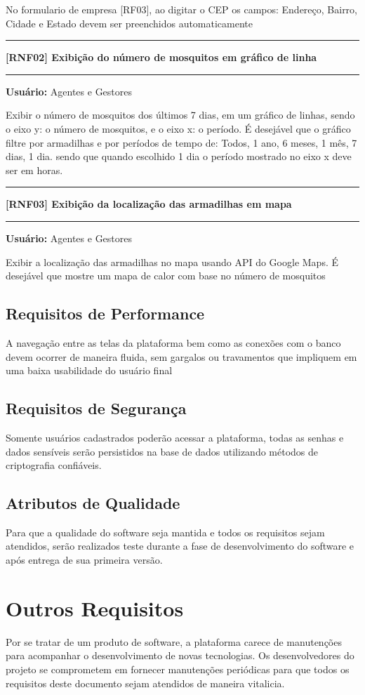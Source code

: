 \documentclass{scrreprt}
\begin{document}
	No formulario de empresa [RF03], ao digitar o CEP os campos: Endereço, Bairro, Cidade e Estado devem ser preenchidos automaticamente
	\begin{center}
		\noindent\rule{16cm}{0.4pt}
		\textbf{[RNF02] Exibição do número de mosquitos em gráfico de linha}
		\noindent\rule{16cm}{0.4pt}
	\end{center}
	\textbf{Usuário:} Agentes e Gestores
	
	Exibir o número de mosquitos dos últimos 7 dias, em um gráfico de linhas, sendo o eixo y: o número de mosquitos, e o eixo x: o período. É desejável que o gráfico filtre por armadilhas e por períodos de tempo de: Todos, 1 ano, 6 meses, 1 mês, 7 dias, 1 dia. sendo que quando escolhido 1 dia o período mostrado no eixo x deve ser em horas.
	\begin{center}
		\noindent\rule{16cm}{0.4pt}
		\textbf{[RNF03] Exibição da localização das armadilhas em mapa}
		\noindent\rule{16cm}{0.4pt}
	\end{center}
	\textbf{Usuário:} Agentes e Gestores
	
	Exibir a localização das armadilhas no mapa usando API do Google Maps. É desejável que mostre um mapa de calor com base no número de mosquitos 
	
	\section{Requisitos de Performance}
	A navegação entre as telas da plataforma bem como as conexões com o banco devem ocorrer de maneira fluida, sem gargalos ou travamentos que impliquem em uma baixa usabilidade do usuário final
	
	\section{Requisitos de Segurança}
	Somente usuários cadastrados poderão acessar a plataforma, todas as senhas e dados sensíveis serão persistidos na base de dados utilizando métodos de criptografia confiáveis.
	
	\section{Atributos de Qualidade}
	Para que a qualidade do software seja mantida e todos os requisitos sejam atendidos, serão realizados teste durante a fase de desenvolvimento do software e após entrega de sua primeira versão.
	
	\chapter{Outros Requisitos}
	Por se tratar de um produto de software, a plataforma carece de manutenções para acompanhar o desenvolvimento de novas tecnologias. Os desenvolvedores do projeto se comprometem em fornecer manutenções periódicas para que todos os requisitos deste documento sejam atendidos de maneira vitalicia.
\end{document}
